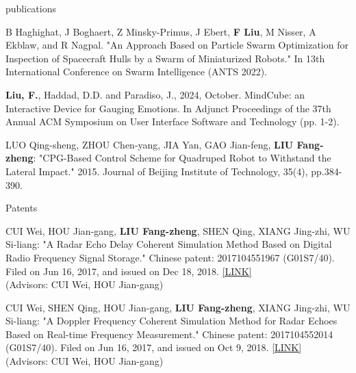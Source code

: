 \documentclass{resume} %
\begin{document}
\begin{rSection}{publications}
\begin{itemlabel}
\item B Haghighat, J Boghaert, Z Minsky-Primus, J Ebert, \textbf{F Liu}, M Nisser, A Ekblaw, and R Nagpal.
"An Approach Based on Particle Swarm Optimization for Inspection of Spacecraft Hulls by a Swarm of Miniaturized Robots."
In 13th International Conference on Swarm Intelligence (ANTS 2022).
\smallskip
\smallskip

\item \textbf{Liu, F.}, Haddad, D.D. and Paradiso, J., 2024, October.
MindCube: an Interactive Device for Gauging Emotions.
In Adjunct Proceedings of the 37th Annual ACM Symposium on User Interface Software and Technology (pp. 1-2).
\smallskip
\smallskip

\item LUO Qing-sheng, ZHOU Chen-yang, JIA Yan, GAO Jian-feng, \textbf{LIU Fang-zheng}:
"CPG-Based Control Scheme for Quadruped Robot to Withstand the Lateral Impact."
2015. Journal of Beijing Institute of Technology, 35(4), pp.384-390.
\end{itemlabel}
\end{rSection}

%
\begin{rSection}{Patents}

\begin{itemlabel}
\item CUI Wei, HOU Jian-gang, \textbf{LIU Fang-zheng}, SHEN Qing, XIANG Jing-zhi, WU Si-liang: "A Radar Echo Delay Coherent Simulation Method Based on Digital Radio Frequency Signal Storage." Chinese patent: 2017104551967 (G01S7/40). Filed on Jun 16, 2017, and issued on Dec 18, 2018. \href{http://www.zlqiao.com/zlqiao/patent-f0301af6125548659bae9e05ed9543d6.html}{[LINK]}\\
(Advisors: CUI Wei, HOU Jian-gang)
\smallskip
\smallskip
\smallskip
\item CUI Wei, SHEN Qing, HOU Jian-gang, \textbf{LIU Fang-zheng}, XIANG Jing-zhi, WU Si-liang: "A Doppler Frequency Coherent Simulation Method for Radar Echoes Based on Real-time Frequency Measurement." Chinese patent: 2017104552014 (G01S7/40). Filed on Jun 16, 2017, and issued on Oct 9, 2018. \href{http://www.zlqiao.com/zlqiao/patent-4dc7dd85795d40a08320e507561834ca.html}{[LINK]}\\
(Advisors: CUI Wei, HOU Jian-gang)
\end{itemlabel}
\end{rSection}

%
\end{document}
